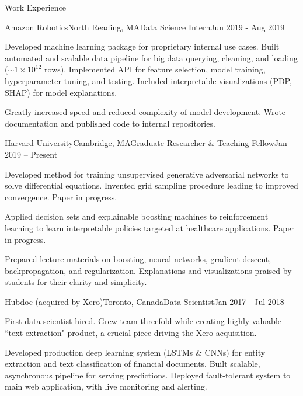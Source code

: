 \documentclass{resume} %
\begin{document}
\begin{rSection}{Work Experience}

\begin{rSubsection}{Amazon Robotics}{North Reading, MA}{Data Science Intern}{Jun 2019 - Aug 2019}
\item 
    Developed machine learning package for proprietary internal use cases. 
    Built automated and scalable data pipeline for big data querying, cleaning, and loading ($\sim 1 \times 10^{12}$ rows). 
    Implemented API for feature selection, model training, hyperparameter tuning, and testing. 
    Included interpretable visualizations (PDP, SHAP) for model explanations.

\item 
    Greatly increased speed and reduced complexity of model development. 
    Wrote documentation and published code to internal repositories. 
\end{rSubsection}


\begin{rSubsection}{Harvard University}{Cambridge, MA}{Graduate Researcher \& Teaching Fellow}{Jan 2019 -- Present}
\item 
    Developed method for training unsupervised generative adversarial networks to solve differential equations.
    Invented grid sampling procedure leading to improved convergence. Paper in progress.
\item 
    Applied decision sets and explainable boosting machines to reinforcement learning to learn interpretable policies targeted at healthcare applications. Paper in progress.
\item 
    Prepared lecture materials on boosting, neural networks, gradient descent, backpropagation, and regularization.
    Explanations and visualizations praised by students for their clarity and simplicity.
\end{rSubsection}


\begin{rSubsection}{Hubdoc (acquired by Xero)}{Toronto, Canada}{Data Scientist}{Jan 2017 - Jul 2018}
\item 
    First data scientist hired. 
    Grew team threefold while creating highly valuable ``text extraction" product, a crucial piece driving the Xero acquisition.
    
\item 
    Developed production deep learning system (LSTMs \& CNNs) for entity extraction and text classification of financial documents.
    Built scalable, asynchronous pipeline for serving predictions.
    Deployed fault-tolerant system to main web application, with live monitoring and alerting.
    

\end{rSubsection}
\end{rSection}
\end{document}
